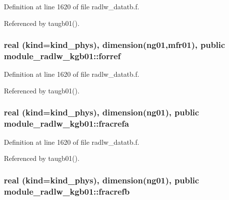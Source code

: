 Definition at line 1620 of file radlw\+\_\+datatb.\+f.



Referenced by taugb01().

\subsubsection[{\texorpdfstring{forref}{forref}}]{\setlength{\rightskip}{0pt plus 5cm}real (kind=kind\+\_\+phys), dimension(ng01,{\bf mfr01}), public module\+\_\+radlw\+\_\+kgb01\+::forref}\hypertarget{namespacemodule__radlw__kgb01_acd70a32f88808dc40c39edee5b76adbe}{}\label{namespacemodule__radlw__kgb01_acd70a32f88808dc40c39edee5b76adbe}


Definition at line 1620 of file radlw\+\_\+datatb.\+f.



Referenced by taugb01().

\subsubsection[{\texorpdfstring{fracrefa}{fracrefa}}]{\setlength{\rightskip}{0pt plus 5cm}real (kind=kind\+\_\+phys), dimension(ng01), public module\+\_\+radlw\+\_\+kgb01\+::fracrefa}\hypertarget{namespacemodule__radlw__kgb01_a0bca660247ac37483cd55c6936056631}{}\label{namespacemodule__radlw__kgb01_a0bca660247ac37483cd55c6936056631}


Definition at line 1620 of file radlw\+\_\+datatb.\+f.



Referenced by taugb01().

\subsubsection[{\texorpdfstring{fracrefb}{fracrefb}}]{\setlength{\rightskip}{0pt plus 5cm}real (kind=kind\+\_\+phys), dimension(ng01), public module\+\_\+radlw\+\_\+kgb01\+::fracrefb}\hypertarget{namespacemodule__radlw__kgb01_a19b6a3893965817e82c77bee1de536cd}{}\label{namespacemodule__radlw__kgb01_a19b6a3893965817e82c77bee1de536cd}


